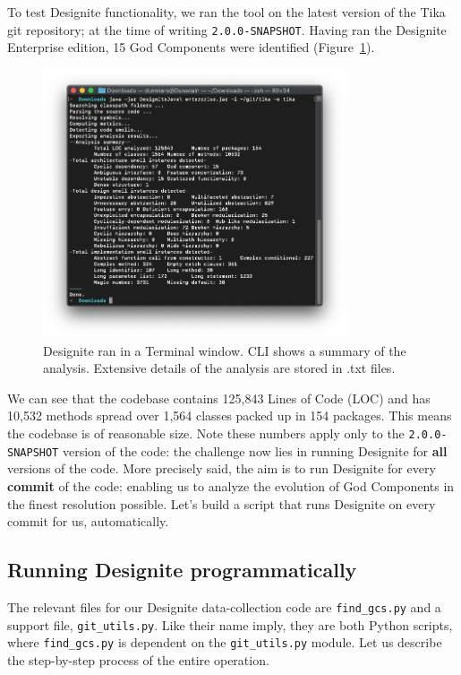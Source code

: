 \documentclass{article}
\begin{document}
To test Designite functionality, we ran the tool on the latest version of the Tika git repository; at the time of writing \texttt{2.0.0-SNAPSHOT}. Having ran the Designite Enterprise edition, 15 God Components were identified (Figure~\ref{fig:designite-cli}).

\begin{figure}[ht]
    \centering
    \includegraphics[width=0.8\textwidth]{report/images/designite/cli_analysis.png}
    \caption{Designite ran in a Terminal window. CLI shows a summary of the analysis. Extensive details of the analysis are stored in .txt files.}
    \label{fig:designite-cli}
\end{figure}

We can see that the codebase contains 125,843 Lines of Code (LOC) and has 10,532 methods spread over 1,564 classes packed up in 154 packages. This means the codebase is of reasonable size. Note these numbers apply only to the \texttt{2.0.0-SNAPSHOT} version of the code: the challenge now lies in running Designite for \textbf{all} versions of the code. More precisely said, the aim is to run Designite for every \textbf{commit} of the code: enabling us to analyze the evolution of God Components in the finest resolution possible. Let's build a script that runs Designite on every commit for us, automatically.

\subsection{Running Designite programmatically}
The relevant files for our Designite data-collection code are \texttt{find\_gcs.py} and a support file, \texttt{git\_utils.py}. Like their name imply, they are both Python scripts, where \texttt{find\_gcs.py} is dependent on the \texttt{git\_utils.py} module. Let us describe the step-by-step process of the entire operation.
\end{document}
